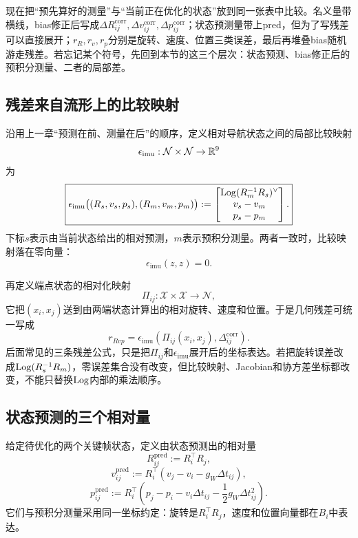 现在把“预先算好的测量”与“当前正在优化的状态”放到同一张表中比较。名义量带横线，bias修正后写成$\Delta R_{ij}^{\mathrm{corr}},\Delta v_{ij}^{\mathrm{corr}},\Delta p_{ij}^{\mathrm{corr}}$；状态预测量带上$\mathrm{pred}$，但为了写残差可以直接展开；$r_R,r_v,r_p$分别是旋转、速度、位置三类误差，最后再堆叠bias随机游走残差。若忘记某个符号，先回到本节的这三个层次：状态预测、bias修正后的预积分测量、二者的局部差。

\subsection{残差来自流形上的比较映射}

沿用上一章“预测在前、测量在后”的顺序，定义相对导航状态之间的局部比较映射
\[
    \epsilon_{\mathrm{imu}}:
    \mathcal N\times\mathcal N\to\mathbb{R}^9
\]
为
\[
\boxed{
    \epsilon_{\mathrm{imu}}\bigl(
      (R_s,v_s,p_s),(R_m,v_m,p_m)
    \bigr)
    :=
    \begin{bmatrix}
      \operatorname{Log}(R_m^{-1}R_s)^\vee\\
      v_s-v_m\\
      p_s-p_m
    \end{bmatrix}.
}
\]
下标$s$表示由当前状态给出的相对预测，$m$表示预积分测量。两者一致时，比较映射落在零向量：
\[
    \epsilon_{\mathrm{imu}}(z,z)=0.
\]

再定义端点状态的相对化映射
\[
    \Pi_{ij}:\mathcal X\times\mathcal X\to\mathcal N,
\]
它把$(x_i,x_j)$送到由两端状态计算出的相对旋转、速度和位置。于是几何残差可统一写成
\[
\boxed{
    r_{Rvp}
    =\epsilon_{\mathrm{imu}}\left(
      \Pi_{ij}(x_i,x_j),
      \Delta_{ij}^{\mathrm{corr}}
    \right).
}
\]
后面常见的三条残差公式，只是把$\Pi_{ij}$和$\epsilon_{\mathrm{imu}}$展开后的坐标表达。若把旋转误差改成$\operatorname{Log}(R_s^{-1}R_m)$，零误差集合没有改变，但比较映射、Jacobian和协方差坐标都改变，不能只替换$\operatorname{Log}$内部的乘法顺序。

\subsection{状态预测的三个相对量}

给定待优化的两个关键帧状态，定义由状态预测出的相对量
\[
    R_{ij}^{\mathrm{pred}}:=R_i^\top R_j,
\]
\[
    v_{ij}^{\mathrm{pred}}
    :=R_i^\top(v_j-v_i-g_W\Delta t_{ij}),
\]
\[
    p_{ij}^{\mathrm{pred}}
    :=R_i^\top
      \left(
        p_j-p_i-v_i\Delta t_{ij}
        -\frac12g_W\Delta t_{ij}^2
      \right).
\]
它们与预积分测量采用同一坐标约定：旋转是$R_i^\top R_j$，速度和位置向量都在$B_i$中表达。

